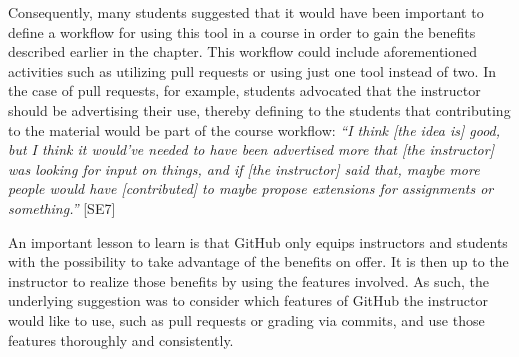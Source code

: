 

Consequently, many students suggested that it would have been important to define a workflow for using this tool in a course in order to gain the benefits described earlier in the chapter. This workflow could include aforementioned activities such as utilizing pull requests or using just one tool instead of two. In the case of pull requests, for example, students advocated that the instructor should be advertising their use, thereby defining to the students that contributing to the material would be part of the course workflow: \textit{``I think [the idea is] good, but I think it would've needed to have been advertised more that [the instructor] was looking for input on things, and if [the instructor] said that, maybe more people would have [contributed] to maybe propose extensions for assignments or something.''} [SE7]

An important lesson to learn is that GitHub only equips instructors and students with the possibility to take advantage of the benefits on offer. It is then up to the instructor to realize those benefits by using the features involved. As such, the underlying suggestion was to consider which features of GitHub the instructor would like to use, such as pull requests or grading via commits, and use those features thoroughly and consistently. \\ %

